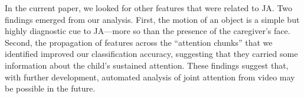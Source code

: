 \documentclass[10pt,letterpaper]{article}
\begin{document}
In the current paper, we looked for other features that were related to JA. Two findings emerged from our analysis. First, the motion of an object is a simple but highly diagnostic cue to JA---more so than the presence of the caregiver's face. Second, the propagation of features across the ``attention chunks'' that we identified improved our classification accuracy, suggesting that they carried some information about the child's sustained attention. These findings suggest that, with further development, automated analysis of joint attention from video may be possible in the future. 




\setlength{\bibleftmargin}{.125in}
\setlength{\bibindent}{-\bibleftmargin}



\end{document}
